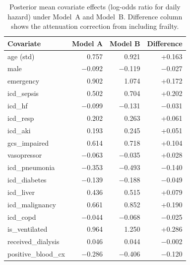 \begin{table}[ht!]
\centering
\small
\caption{Posterior mean covariate effects (log-odds ratio for daily hazard) under Model~A and Model~B. Difference column shows the attenuation correction from including frailty.}
\label{tab:beta-comparison}
\begin{tabular}{lrrr}
\toprule
\textbf{Covariate} & \textbf{Model A} & \textbf{Model B} & \textbf{Difference} \\
\midrule
\rowcolor{rowgray} age (std) & 0.757 & 0.921 & +0.163 \\
male & $-$0.092 & $-$0.119 & $-$0.027 \\
\rowcolor{rowgray} emergency & 0.902 & 1.074 & +0.172 \\
icd\_sepsis & 0.502 & 0.704 & +0.202 \\
\rowcolor{rowgray} icd\_hf & $-$0.099 & $-$0.131 & $-$0.031 \\
icd\_resp & 0.202 & 0.263 & +0.061 \\
\rowcolor{rowgray} icd\_aki & 0.193 & 0.245 & +0.051 \\
gcs\_impaired & 0.614 & 0.718 & +0.104 \\
\rowcolor{rowgray} vasopressor & $-$0.063 & $-$0.035 & +0.028 \\
icd\_pneumonia & $-$0.353 & $-$0.493 & $-$0.140 \\
\rowcolor{rowgray} icd\_diabetes & $-$0.139 & $-$0.188 & $-$0.049 \\
icd\_liver & 0.436 & 0.515 & +0.079 \\
\rowcolor{rowgray} icd\_malignancy & 0.661 & 0.852 & +0.190 \\
icd\_copd & $-$0.044 & $-$0.068 & $-$0.025 \\
\rowcolor{rowgray} is\_ventilated & 0.964 & 1.250 & +0.286 \\
received\_dialysis & 0.046 & 0.044 & $-$0.002 \\
\rowcolor{rowgray} positive\_blood\_cx & $-$0.286 & $-$0.406 & $-$0.120 \\
\bottomrule
\end{tabular}
\end{table}
